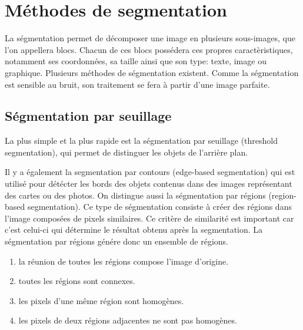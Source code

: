 \documentclass[]{report}
\begin{document}

    \section{M\'ethodes de segmentation} %
    \label{sec:m'ethodes_de_s\'egmentation}
      La ségmentation permet de décomposer une image en plusieurs sous-images, que l'on appellera blocs. Chacun de ces blocs possédera ces propres caractèristiques, notamment ses coordonnées, sa taille ainsi que son type: texte, image ou graphique. Plusieurs méthodes de ségmentation existent. Comme la ségmentation est sensible au bruit, son traitement se fera à partir d'une image parfaite.
      \subsection{Ségmentation par seuillage}
      La plus simple et la plus rapide est la ségmentation par seuillage (threshold segmentation), qui permet de distinguer les objets de l'arrière plan.
      
      
      Il y a également la segmentation par contours (edge-based segmentation) qui est utilisé pour détécter les bords des objets contenus dans des images représentant des cartes ou des photos.
      On distingue aussi la ségmentation par régions (region-based segmentation). Ce type de ségmentation consiste à créer des régions dans l'image composées de pixels similaires. Ce critère de similarité est important car c'est celui-ci qui détermine le résultat obtenu après la segmentation. La ségmentation par régions génére donc un ensemble de régions.
      \begin{enumerate}
        \item la réunion de toutes les régions compose l'image d'origine.
        \item toutes les régions sont connexes.
        \item les pixels d'une même région sont homogènes.
        \item les pixels de deux régions adjacentes ne sont pas homogènes.
      \end{enumerate}
      
      


\end{document}
